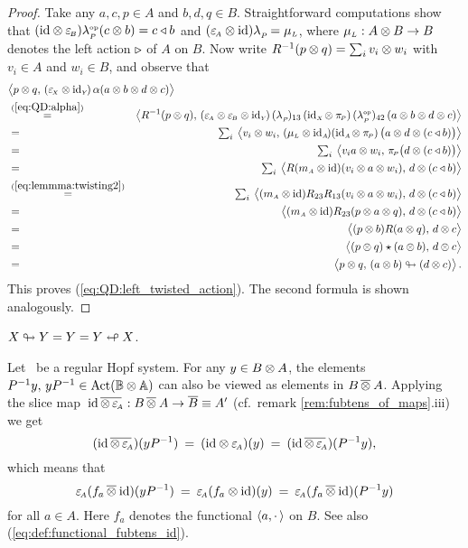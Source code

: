 \begin{proof}
Take any $a,c,p \in A$ and $b,d,q \in B$. Straightforward computations show that
$(\mbox{\rm id} \otimes \varepsilon_{\scriptscriptstyle \! B}) \lambda^{\scriptscriptstyle \rm op}_{_P\!}(c \otimes b) = c \triangleleft b$ and $(\varepsilon_{\scriptscriptstyle \! A} \otimes \mbox{\rm id}) \lambda_{_P\!} = \mu_{\scriptscriptstyle L}$,
where $\mu_{\scriptscriptstyle L}: A \otimes B \rightarrow B $ denotes the left action $\triangleright$ of $A$ on $B$.
Now write $R^{-1}(p\otimes q) = \sum_i v_i\otimes w_i$ with $v_i \in A$ and $w_i \in B$,
and observe that
\begin{eqnarray*}
\lefteqn{\pairM{p\tens q}{(\epsX \tens \idY)\, \alpha(a \tens b  \tens d \tens c)}}
\\&\stackrel{(\ref{eq:QD:alpha})}{=}&
\pairM{R^{-1}(p\tens q)}{(\epsA \tens \epsB \tens \idY)\,
         (\lp)_{13} \, (\idX \tens \piP) \, (\lpop)_{42}\, (a \tens b \tens d \tens c)}
\\&=&
\textstyle \sum_i \:
\pairM{v_i \tens w_i}{(\muL \tens \idA)(\idA \tens \piP)
                  \left(a \tens d \tens (c \ract b) \vertM\right)}
\\&=&
\textstyle \sum_i \:
\pairM{v_i a \tens w_i}{\piP \! \left(d \tens (c \ract b) \vertM\right)}
\\&=&
\textstyle \sum_i \:
\pairM{R(\mult{A} \tens \id) (v_i \tens  a \tens w_i)}{d \tens (c \ract b)}
\\&\stackrel{(\ref{eq:lemmma:twisting2})}{=}&
\textstyle \sum_i \:
\pairM{(\mult{A} \tens \id) R_{23} R_{13} (v_i \tens  a \tens w_i)}{d \tens (c \ract b)}
\\&=&
\pairM{(\mult{A} \tens \id) R_{23} (p \tens a \tens q)}{d \tens (c \ract b)}
\\&=&
\pairM{(p\tens b)R(a \tens q)}{d \tens c}
\\&=&
\pairM{(p\tens q) \star (a \tens b)}{d \tens c}
\\&=&
\pairM{p\tens q}{(a \tens b) \ltact (d \tens c)}.
\end{eqnarray*}
This proves (\ref{eq:QD:left_twisted_action}).
The second formula is shown analogously.
\end{proof}


\begin{cor} \label{cor:QD:X_acts_on_Y:unital}
$X \looparrowright Y = Y = Y \looparrowleft X$.
\end{cor}



\begin{lemma}
Let\/ \pairAB\ be a regular Hopf system. For any\/ $y \in B \otimes A$, the elements\/
$P^{-1}y, \, yP^{-1} \in \mbox{\rm Act}(\mathbb{B} \otimes \mathbb{A})$
can also be viewed as elements in\/ $B \,\overline{\otimes}\: A$. Applying the slice map\/
$\,\mbox{\rm id} \, \overline{\otimes \, \varepsilon_{\scriptscriptstyle \! A}\!}\, : B \,\overline{\otimes}\: A \rightarrow \overline{B}\equiv A'$
(cf.\ remark \ref{rem:fubtens_of_maps}.iii) we get
\begin{equation}\label{eq:QD:lemma:id_tens_eps:yPinv}
 (\mbox{\rm id} \, \overline{\otimes \, \varepsilon_{\scriptscriptstyle \! A}\!}\,)(yP^{-1})
     \:=\:  (\mbox{\rm id} \otimes \varepsilon_{\scriptscriptstyle \! A})(y)
     \:=\:  (\mbox{\rm id} \, \overline{\otimes \, \varepsilon_{\scriptscriptstyle \! A}\!}\,)(P^{-1}y),
\end{equation}
which means that
$$ \varepsilon_{\scriptscriptstyle \! A} (f_a \,\overline{\otimes}\: \mbox{\rm id}) (yP^{-1})
      \:=\: \varepsilon_{\scriptscriptstyle \! A} (f_a \otimes \mbox{\rm id})(y)
      \:=\: \varepsilon_{\scriptscriptstyle \! A} (f_a \,\overline{\otimes}\: \mbox{\rm id}) (P^{-1}y) $$
for all\/ $a\in A$.
\rm Here $f_a$ denotes the functional $\langle a,\cdot\, \rangle$ on $B$.
See also (\ref{eq:def:functional_fubtens_id}).
\end{lemma}

